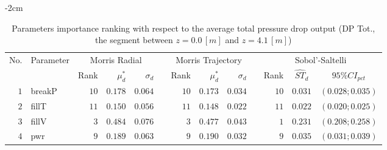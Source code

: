 \begin{table*}[!htbp]\centering
{}
\begin{adjustwidth*}{}{-2cm}
\caption{Parameters importance ranking with respect to the average total pressure drop output (DP Tot., the segment between $z = 0.0 \, [m]$ and $z = 4.1 \, [m]$)}
\label{tab:app_screening_dptot_average}
\begin{tabular}{@{}rlrrrrrrrrrcc@{}}\toprule
\multirow{2}{*}{\footnotesize{No.}} & \multirow{2}{*}{\footnotesize{Parameter}} & \multicolumn{3}{c}{\footnotesize{Morris Radial}} & \phantom{a} & \multicolumn{3}{c}{\footnotesize{Morris Trajectory}}  &\phantom{a}& \multicolumn{3}{c}{\footnotesize{Sobol'-Saltelli}}                               \\             
                                                                                  \cmidrule{3-5}                                                   \cmidrule{7-9}                                                      \cmidrule{11-13}
                                    &                                           & \footnotesize{Rank}   & $\mu^*_d$ & $\sigma_d$   &             & \footnotesize{Rank} & $\mu^*_d$ & $\sigma_d$          &           & \footnotesize{Rank} & \footnotesize{$\hat{ST}_d$} & \footnotesize{$95\%CI_{pct}$}\\ \midrule
\footnotesize{$1 $} & \footnotesize{breakP   } & \footnotesize{$10$} & \footnotesize{$0.178$} & \footnotesize{$0.064$} && \footnotesize{$10$} & \footnotesize{$0.173$} & \footnotesize{$0.034$} && \footnotesize{$10$} & \footnotesize{$0.031$} & \footnotesize{$(0.028;0.035)$} \\
\footnotesize{$2 $} & \footnotesize{fillT    } & \footnotesize{$11$} & \footnotesize{$0.150$} & \footnotesize{$0.056$} && \footnotesize{$11$} & \footnotesize{$0.148$} & \footnotesize{$0.022$} && \footnotesize{$11$} & \footnotesize{$0.022$} & \footnotesize{$(0.020;0.025)$} \\
\footnotesize{$3 $} & \footnotesize{fillV    } & \footnotesize{$3 $} & \footnotesize{$0.484$} & \footnotesize{$0.076$} && \footnotesize{$3 $} & \footnotesize{$0.477$} & \footnotesize{$0.043$} && \footnotesize{$1 $} & \footnotesize{$0.231$} & \footnotesize{$(0.208;0.258)$} \\
\footnotesize{$4 $} & \footnotesize{pwr      } & \footnotesize{$9 $} & \footnotesize{$0.189$} & \footnotesize{$0.063$} && \footnotesize{$9 $} & \footnotesize{$0.190$} & \footnotesize{$0.032$} && \footnotesize{$9 $} & \footnotesize{$0.035$} & \footnotesize{$(0.031;0.039)$} \\

\end{tabular}
\end{adjustwidth*}
\end{table*}
